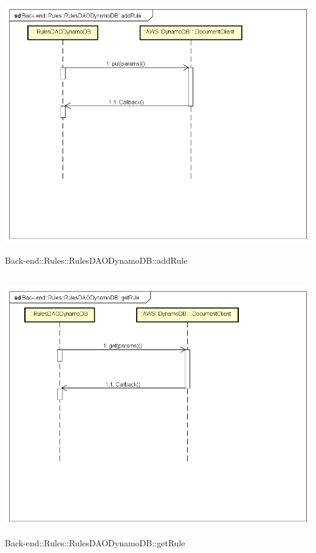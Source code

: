 \\ \includegraphics[width=\textwidth,height=\textheight,keepaspectratio]{images/diagrams/back-end/Ufficial_Backend/Back-end__Rules__RulesDAODynamoDB__addRule.png} 	\caption{Back-end::Rules::RulesDAODynamoDB::addRule}
\\ \includegraphics[width=\textwidth,height=\textheight,keepaspectratio]{images/diagrams/back-end/Ufficial_Backend/Back-end__Rules__RulesDAODynamoDB__getRule.png} 	\caption{Back-end::Rules::RulesDAODynamoDB::getRule}
